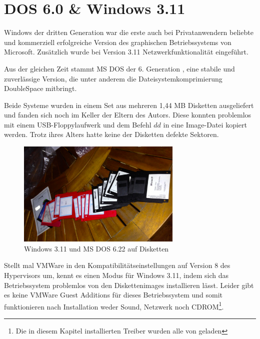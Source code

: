 \newpage

\section{DOS 6.0 \& Windows 3.11}
	Windows der dritten Generation war die erste auch bei Privatanwendern beliebte und kommerziell erfolgreiche Version des graphischen Betriebssystems von Microsoft.
	Zusätzlich wurde bei Version 3.11 Netzwerkfunktionalität eingeführt.

	Aus der gleichen Zeit stammt MS DOS der 6. Generation \cite{WinHistory}, eine stabile und zuverlässige Version, die unter anderem die Dateisystemkomprimierung DoubleSpace mitbringt.

	Beide Systeme wurden in einem Set aus mehreren 1,44 MB Disketten ausgeliefert und fanden sich noch im Keller der Eltern des Autors.
	Diese konnten problemlos mit einem USB-Floppylaufwerk und dem Befehl $dd$ in eine Image-Datei kopiert werden.
	Trotz ihres Alters hatte keine der Disketten defekte Sektoren.

		\begin{figure}[h]
		\begin{center}
			\includegraphics[width=0.7\textwidth]{img/win311disks.jpg}
			\caption{Windows 3.11 und MS DOS 6.22 auf Disketten}
			\label{fig:screenshot-win311disks}
		\end{center}
	\end{figure}


	Stellt mal VMWare in den Kompatibilitätseinstellungen auf Version 8 des Hypervisors um, kennt es einen Modus für Windows 3.11, indem sich das Betriebssystem problemlos von den Diskettenimages installieren lässt. Leider gibt es keine VMWare Guest Additions für dieses Betriebssystem und somit funktionieren nach Installation weder Sound, Netzwerk noch CDROM\footnote{Die in diesem Kapitel installierten Treiber wurden alle von \cite{VMDriver} geladen}.

